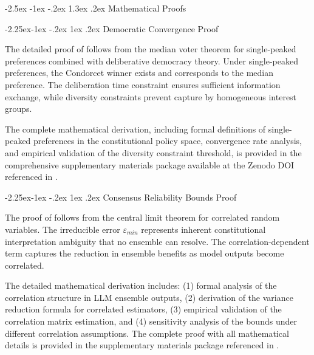 \documentclass[manuscript,screen,9pt]{acmart}
\makeatletter
\renewcommand\section{\@startsection{section}{1}{\z@}%
  {-2.5ex \@plus -1ex \@minus -.2ex}%
  {1.3ex \@plus.2ex}%
  {\normalfont\Large\bfseries}}
\renewcommand\subsection{\@startsection{subsection}{2}{\z@}%
  {-2.25ex\@plus -1ex \@minus -.2ex}%
  {1ex \@plus .2ex}%
  {\normalfont\large\bfseries}}
\makeatother
\begin{document}
\section{Mathematical Proofs}
\label{app:mathematical_proofs}

\subsection{Democratic Convergence Proof}
\label{app:democratic_convergence_proof}

The detailed proof of  follows from the median voter theorem for single-peaked preferences combined with deliberative democracy theory. Under single-peaked preferences, the Condorcet winner exists and corresponds to the median preference. The deliberation time constraint ensures sufficient information exchange, while diversity constraints prevent capture by homogeneous interest groups.

The complete mathematical derivation, including formal definitions of single-peaked preferences in the constitutional policy space, convergence rate analysis, and empirical validation of the diversity constraint threshold, is provided in the comprehensive supplementary materials package available at the Zenodo DOI referenced in .

\subsection{Consensus Reliability Bounds Proof}
\label{app:consensus_bounds_proof}

The proof of  follows from the central limit theorem for correlated random variables. The irreducible error $\varepsilon_{min}$ represents inherent constitutional interpretation ambiguity that no ensemble can resolve. The correlation-dependent term captures the reduction in ensemble benefits as model outputs become correlated.

The detailed mathematical derivation includes: (1) formal analysis of the correlation structure in LLM ensemble outputs, (2) derivation of the variance reduction formula for correlated estimators, (3) empirical validation of the correlation matrix estimation, and (4) sensitivity analysis of the bounds under different correlation assumptions. The complete proof with all mathematical details is provided in the supplementary materials package referenced in .
\end{document}
